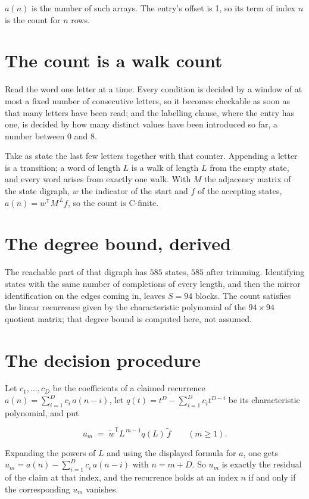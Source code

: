 \documentclass[11pt]{article}
\theoremstyle{definition}
\begin{document}
$a(n)$ is the number of such arrays. The entry's offset is 1, so its term of index $n$ is the count for $n$ rows.

\section{The count is a walk count}

Read the word one letter at a time. Every condition is decided by a window of at most a fixed number of consecutive letters, so it becomes checkable as soon as that many letters have been read; and the labelling clause, where the entry has one, is decided by how many distinct values have been introduced so far, a number between $0$ and 8.

Take as state the last few letters together with that counter. Appending a letter is a transition; a word of length $L$ is a walk of length $L$ from the empty state, and every word arises from exactly one walk. With $M$ the adjacency matrix of the state digraph, $w$ the indicator of the start and $f$ of the accepting states, $a(n) = w^{\mathsf T}M^{\,L}f$, so the count is C-finite.

\section{The degree bound, derived}

The reachable part of that digraph has $585$ states, $585$ after trimming. Identifying states with the same number of completions of every length, and then the mirror identification on the edges coming in, leaves $S = 94$ blocks. The count satisfies the linear recurrence given by the characteristic polynomial of the $94\times94$ quotient matrix; that degree bound is computed here, not assumed.

\section{The decision procedure}

Let $c_1,\dots,c_D$ be the coefficients of a claimed recurrence $a(n) = \sum_{i=1}^{D} c_i\,a(n-i)$, let $q(t) = t^{D} - \sum_{i=1}^{D} c_i t^{D-i}$ be its characteristic polynomial, and put

\[u_m \;=\; \tilde w^{\mathsf T} L^{\,m-1} q(L)\,\tilde f \qquad (m \ge 1).\]

Expanding the powers of $L$ and using the displayed formula for $a$, one gets $u_m = a(n) - \sum_{i=1}^{D} c_i\,a(n-i)$ with $n = m + D$. So $u_m$ is exactly the residual of the claim at that index, and the recurrence holds at an index $n$ if and only if the corresponding $u_m$ vanishes.
\end{document}
